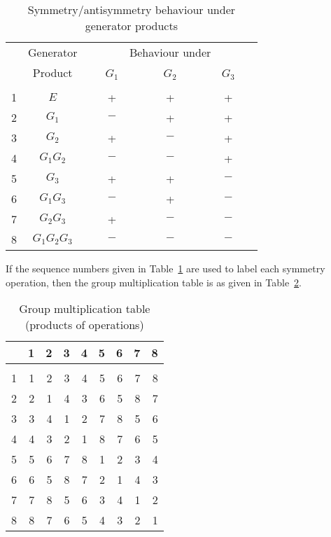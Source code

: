 \begin{table}[hbt]
  \caption{Symmetry/antisymmetry behaviour under generator products}
  \label{tab:ops}
\begin{center}
  \begin{tabular}{c|c|ccc}
      & Generator & \multicolumn{3}{c}{Behaviour under}\\
      &  Product        & ~~~$G_1$~~~ & ~~~$G_2$~~~ & ~~~$G_3$~~~ \\
    \hline\\[-7pt]
    1 &      $E$        &  +  &  +  &  + \\
    2 &     $G_1$       & $-$ &  +  &  + \\
    3 &     $G_2$       &  +  & $-$ &  + \\
    4 &   $G_1$$G_2$    & $-$ & $-$ &  + \\
    5 &     $G_3$       &  +  &  +  & $-$\\
    6 &   $G_1$$G_3$    & $-$ &  +  & $-$\\
    7 &   $G_2$$G_3$    &  +  & $-$ & $-$\\
    8 & $G_1$$G_2$$G_3$ & $-$ & $-$ & $-$
  \end{tabular}
\end{center}
\end{table}

  If
the sequence numbers given in Table~\ref{tab:ops} are used to label
each symmetry operation, then the group multiplication table is as
given in Table~\ref{tab:mult}.

\begin{table}[hbt]
  \caption{Group multiplication table (products of operations)}
  \label{tab:mult}
\begin{center}
  \begin{tabular}{r|rrrrrrrr}
    & 1 & 2 & 3 & 4 & 5 & 6 & 7 & 8\\
    \hline\\[-7pt]
    1 & 1 & 2 & 3 & 4 & 5 & 6 & 7 & 8\\
    2 & 2 & 1 & 4 & 3 & 6 & 5 & 8 & 7\\
    3 & 3 & 4 & 1 & 2 & 7 & 8 & 5 & 6\\
    4 & 4 & 3 & 2 & 1 & 8 & 7 & 6 & 5\\
    5 & 5 & 6 & 7 & 8 & 1 & 2 & 3 & 4\\
    6 & 6 & 5 & 8 & 7 & 2 & 1 & 4 & 3\\
    7 & 7 & 8 & 5 & 6 & 3 & 4 & 1 & 2\\
    8 & 8 & 7 & 6 & 5 & 4 & 3 & 2 & 1
  \end{tabular}
\end{center}
\end{table}


